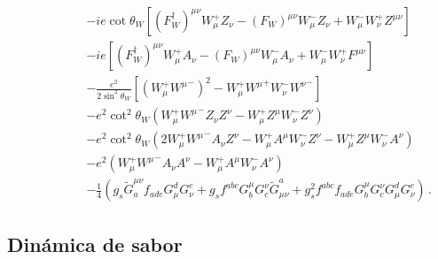 \begin{frame}{}




\begin{align}
  \phantom{\mathcal{L}_{\text{1 gen}}=}
&-ie\cot\theta_W\left[(F_W^\dagger)^{\mu\nu}W_\mu^+ Z_\nu-(F_W)^{\mu\nu}W_\mu^- Z_\nu+W_\mu^-W_\nu^+Z^{\mu\nu}\right]\nonumber\\
&-ie\left[(F_W^\dagger)^{\mu\nu}W_\mu^+ A_\nu-(F_W)^{\mu\nu}W_\mu^- A_\nu+W_\mu^-W_\nu^+F^{\mu\nu}\right]\nonumber\\
&-\frac{e^2}{2\sin^2\theta_W}\left[\left(W_\mu^+{W^\mu}^-\right)^2-W_\mu^+{W^\mu}^+W_\nu^-{W^\nu}^-\right]\nonumber\\
&-e^2\cot^2\theta_W\left(W_\mu^+{W^\mu}^-Z_\nu Z^\nu-W_\mu^+Z^\mu W_\nu^-Z^\nu\right)\nonumber\\
&-e^2\cot^2\theta_W\left(2W_\mu^+{W^\mu}^-A_\nu Z^\nu-W_\mu^+A^\mu W_\nu^-Z^\nu-W_\mu^+Z^\mu W_\nu^-A^\nu\right)\nonumber\\
&-e^2\left(W_\mu^+{W^\mu}^-A_\nu A^\nu-W_\mu^+A^\mu W_\nu^-A^\nu\right)\nonumber\\
&- \frac{1}{4}\left(g_s\widetilde{G}^{\mu\nu}_af_{a d e}G^d_\mu G^e_\nu
    +g_sf^{a b c}G_b^\mu G_c^\nu\widetilde{G}_{\mu\nu}^a
    +g_s^2f^{a b c}f_{a d e}G_b^\mu G_c^\nu G^d_\mu G^e_\nu\right)\,.
\end{align}
     
     
\end{frame}

\subsection{Dinámica de sabor}
\label{sec:dinamica-de-sabor}


